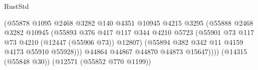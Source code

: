 \begin{lexlean}{RustStd}
\begin{coremodule}
                                                  (@55878
                                                    @1095
                                                    @2468
                                                    @3282
                                                    @140
                                                    @4351
                                                    @10945
                                                    @4215
                                                    @3295
                                                    (@55888
                                                      @2468
                                                      @3282
                                                      @10945
                                                      (@55893
                                                        @376
                                                        @417
                                                        @117
                                                        @344
                                                        @4210
                                                        @5723
                                                        (@55901
                                                          @73
                                                          @117
                                                          @73
                                                          @4210
                                                          (@12447 (@55906 @73))
                                                          @12807)
                                                        (@55894
                                                          @382
                                                          @342
                                                          @11
                                                          @4159
                                                          @4173
                                                          @55910
                                                          @55928)))
                                                    @44864
                                                    @44867
                                                    @44870
                                                    @44873
                                                    @15647))))
                                            (@14315 (@55848 @30))
                                            (@12571 (@55852 @770 @1199))

\end{coremodule}
\end{lexlean}
